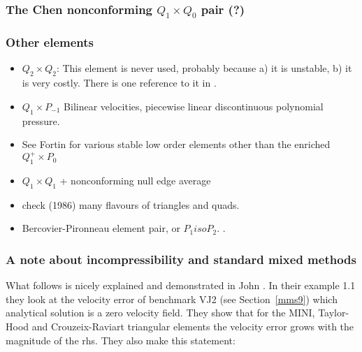 \subsubsection{The Chen nonconforming $Q_1\times Q_0$ pair (?)} \label{ss:chenq0}



\subsubsection{Other elements}

\begin{itemize}

\item $Q_2\times Q_2$: This element is never used, probably because a) it is unstable, b) it is very costly. 
There is one reference to it in \cite{hufb86}.

\item $Q_1\times P_{-1}$ Bilinear velocities,  piecewise linear discontinuous polynomial pressure.

\item See Fortin \cite{fort81} for various stable low order elements other than the enriched $Q_1^+ \times P_0$

\item $Q_1\times Q_1$ + nonconforming null edge average \cite{fros07}

\item check \textcite{dhhu86} (1986) many flavours of triangles and quads.

\item Bercovier-Pironneau element pair, or $P_1isoP_2$. \textcite{bocg12}.

\end{itemize}

\subsubsection{A note about incompressibility and standard mixed methods}

What follows is nicely explained and demonstrated in John \etal \cite{jolm17}. In their 
example 1.1 they look at the velocity error of benchmark VJ2 (see Section~\ref{mms9}) 
which analytical solution is a zero velocity field. They show that for the MINI, 
Taylor-Hood and Crouzeix-Raviart triangular elements the velocity error grows 
with the magnitude of the rhs. They also make this statement:


